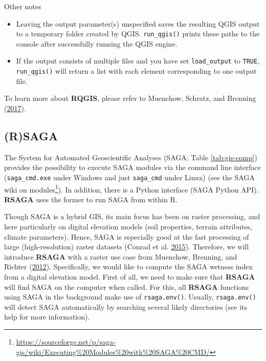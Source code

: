 \documentclass[]{krantz}
\providecommand{\tightlist}{%
  \setlength{\itemsep}{0pt}\setlength{\parskip}{0pt}}
\let\rmarkdownfootnote\footnote%
\def\footnote{\protect\rmarkdownfootnote}
\renewcommand{\href}[2]{#2\footnote{\url{#1}}}
\begin{document}
Other notes

\begin{itemize}
\tightlist
\item
  Leaving the output parameter(s) unspecified saves the resulting QGIS output to a temporary folder created by QGIS.
  \texttt{run\_qgis()} prints these paths to the console after successfully running the QGIS engine.
\item
  If the output consists of multiple files and you have set \texttt{load\_output} to \texttt{TRUE}, \texttt{run\_qgis()} will return a list with each element corresponding to one output file.
\end{itemize}

To learn more about \textbf{RQGIS}, please refer to Muenchow, Schratz, and Brenning (\protect\hyperlink{ref-muenchow_rqgis:_2017}{2017}).

\hypertarget{rsaga}{%
\subsection{(R)SAGA}\label{rsaga}}

The System for Automated Geoscientific Analyses (SAGA; Table \ref{tab:gis-comp}) provides the possibility to execute SAGA modules via the command line interface (\texttt{saga\_cmd.exe} under Windows and just \texttt{saga\_cmd} under Linux) (see the \href{https://sourceforge.net/p/saga-gis/wiki/Executing\%20Modules\%20with\%20SAGA\%20CMD/}{SAGA wiki on modules}).
In addition, there is a Python interface (SAGA Python API).
\textbf{RSAGA} uses the former to run SAGA from within R.

Though SAGA is a hybrid GIS, its main focus has been on raster processing, and here particularly on digital elevation models (soil properties, terrain attributes, climate parameters).
Hence, SAGA is especially good at the fast processing of large (high-resolution) raster datasets (Conrad et al. \protect\hyperlink{ref-conrad_system_2015}{2015}).
Therefore, we will introduce \textbf{RSAGA} with a raster use case from Muenchow, Brenning, and Richter (\protect\hyperlink{ref-muenchow_geomorphic_2012}{2012}).
Specifically, we would like to compute the SAGA wetness index from a digital elevation model.
First of all, we need to make sure that \textbf{RSAGA} will find SAGA on the computer when called.
For this, all \textbf{RSAGA} functions using SAGA in the background make use of \texttt{rsaga.env()}.
Usually, \texttt{rsaga.env()} will detect SAGA automatically by searching several likely directories (see its help for more information).
\end{document}
